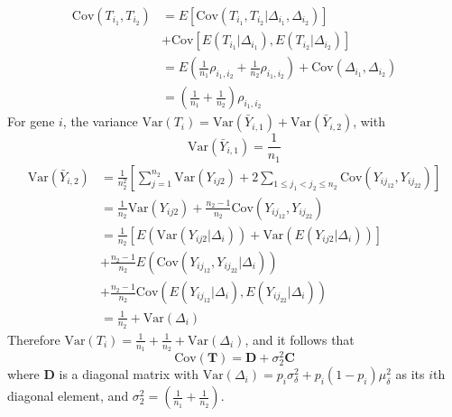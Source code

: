 \documentclass[useAMS,usenatbib, galley]{biom}
\begin{document}
	\begin{equation}
	\begin{aligned}
	\text{Cov}(T_{i_1}, T_{i_2}) & = E\left[\text{Cov}(T_{i_1}, T_{i_2}|\Delta_{i_1}, \Delta_{i_2}) \right] \\
	&  + \text{Cov}\left[E(T_{i_1}|\Delta_{i_1}), E(T_{i_2}|\Delta_{i_2})\right] \\
	& = E\left(\frac{1}{n_1}\rho_{i_1,i_2} + \frac{1}{n_2}\rho_{i_1,i_2}\right) + \text{Cov}(\Delta_{i_1}, \Delta_{i_2})\\
	& = \left(\frac{1}{n_1} + \frac{1}{n_2}\right)\rho_{i_1,i_2}
	\end{aligned}
	\end{equation}
	For gene $i$, the variance $\text{Var}(T_i) = \text{Var}(\bar{Y}_{i, 1}) + \text{Var}(\bar{Y}_{i, 2})$, with
	\[\text{Var}(\bar{Y}_{i, 1}) = \frac{1}{n_1}\] 
	\begin{equation}
	\begin{aligned}
	\text{Var}(\bar{Y}_{i, 2}) & = \frac{1}{n_2^2}\left[\sum_{j=1}^{n_2}\text{Var}(Y_{ij2}) + 2\sum_{1\leq j_1<j_2 \leq n_2} \text{Cov}(Y_{ij_12}, Y_{ij_22})\right] \\
	& = \frac{1}{n_2}\text{Var}(Y_{ij2}) + \frac{n_2-1}{n_2} \text{Cov}(Y_{ij_12}, Y_{ij_22})\\
	& = \frac{1}{n_2}\left[E\left(\text{Var}(Y_{ij2}|\Delta_i)\right) + \text{Var}\left(E(Y_{ij2}|\Delta_i)\right)\right] \\ \text{~~~} &+\frac{n_2-1}{n_2}E\left(\text{Cov}(Y_{ij_12}, Y_{ij_22}|\Delta_i)\right) \\ &+\frac{n_2-1}{n_2}\text{Cov}\left(E(Y_{ij_12}|\Delta_i), E(Y_{ij_22}|\Delta_i)\right) \\
	& = \frac{1}{n_2} + \text{Var}(\Delta_i)
	\end{aligned}
	\end{equation}
	Therefore $\text{Var}(T_i)  = \frac{1}{n_1} + \frac{1}{n_2} + \text{Var}(\Delta_i)$, and it follows that
	\begin{equation}\label{eq:tvar}
	\text{Cov}(\bm T) =  \bm D + \sigma_2^2\bm C 
	\end{equation}
	where $\bm D$ is a diagonal matrix with $\text{Var}(\Delta_i) =p_i\sigma_{\delta}^2 + p_i(1-p_i)\mu_{\delta}^2$ as its $i$th diagonal element, and $\sigma_2^2 = \left(\frac{1}{n_1} + \frac{1}{n_2}\right)$.
	
	
	
	
	
	
	\newpage
	
	
\end{document}
